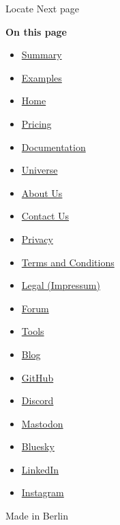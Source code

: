 { Locate } { Next page }

\textbf{On this page}

\begin{itemize}
\tightlist
\item
  \hyperref[summary]{Summary}
\item
  \hyperref[examples]{Examples}
\end{itemize}

\begin{itemize}
\tightlist
\item
  \href{/}{Home}
\item
  \href{/pricing/}{Pricing}
\item
  \href{/docs/}{Documentation}
\item
  \href{/universe/}{Universe}
\item
  \href{/about/}{About Us}
\item
  \href{/contact/}{Contact Us}
\item
  \href{/privacy/}{Privacy}
\item
  \href{https://typst.app/terms}{Terms and Conditions}
\item
  \href{/legal/}{Legal (Impressum)}
\end{itemize}

\begin{itemize}
\tightlist
\item
  \href{https://forum.typst.app}{Forum}
\item
  \href{/tools/}{Tools}
\item
  \href{/blog/}{Blog}
\item
  \href{https://github.com/typst/}{GitHub}
\item
  \href{https://discord.gg/2uDybryKPe}{Discord}
\item
  \href{https://mastodon.social/@typst}{Mastodon}
\item
  \href{https://bsky.app/profile/typst.app}{Bluesky}
\item
  \href{https://www.linkedin.com/company/typst/}{LinkedIn}
\item
  \href{https://instagram.com/typstapp/}{Instagram}
\end{itemize}

Made in Berlin
